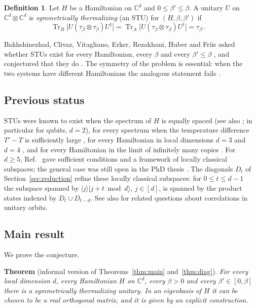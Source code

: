 \documentclass[11pt]{amsart}
\theoremstyle{definition}
\newtheorem{definition}[lemma]{Definition}
\theoremstyle{remark}
\numberwithin{equation}{section}
\newcommand{\C}{\mathbb{C}}
\newcommand{\Tr}{\operatorname{Tr}}
\begin{document}
\begin{definition}\label{def:stu}
Let $H$ be a Hamiltonian on $\C^d$ and $0\le\beta'\le\beta$. A unitary $U$ on $\C^d\otimes\C^d$ is
\emph{symmetrically thermalizing} (an STU) for $(H,\beta,\beta')$ if
\[
  \Tr_B\bigl[U(\tau_\beta\otimes\tau_\beta)U^\dagger\bigr]
  =\Tr_A\bigl[U(\tau_\beta\otimes\tau_\beta)U^\dagger\bigr]=\tau_{\beta'} .
\]
\end{definition}

Bakhshinezhad, Clivaz, Vitagliano, Erker, Rezakhani, Huber and Friis asked whether STUs exist for
every Hamiltonian, every $\beta$ and every $\beta'\le\beta$ \cite[Question~2]{BakhshinezhadEtAl2019},
and conjectured that they do \cite[Sec.~IV]{BakhshinezhadEtAl2019}. The symmetry of the problem is
essential: when the two systems have different Hamiltonians the analogous statement fails
\cite[Sec.~II.1.1]{BakhshinezhadEtAl2019}.

\subsection{Previous status}
STUs were known to exist when the spectrum of $H$ is equally spaced \cite{HuberEtAl2015} (see also
\cite{JevticJenningsRudolph2012,McKayEtAl2018}; in particular for qubits, $d=2$), for every spectrum when the temperature difference $T'-T$ is
sufficiently large \cite[App.~A.1]{HuberEtAl2015}, for every Hamiltonian in local dimensions $d=3$ and
$d=4$ \cite{BakhshinezhadEtAl2019}, and for every Hamiltonian in the limit of infinitely many copies
\cite[Sec.~II.2.3]{BakhshinezhadEtAl2019}. For $d\ge5$, Ref.~\cite{BakhshinezhadEtAl2019} gave sufficient
conditions and a framework of locally classical subspaces; the general case was still open in the
PhD thesis \cite{Clivaz2020}. The diagonals $D_t$ of Section~\ref{sec:reduction} refine these locally
classical subspaces: for $0\le t\le d-1$ the subspace spanned by $|j\rangle|j+t \bmod d\rangle$, $j\in[d]$,
is spanned by the product states indexed by $D_t\cup D_{t-d}$. See also \cite{JevticJenningsRudolph2012,McKayEtAl2018} for related
questions about correlations in unitary orbits.

\subsection{Main result}
We prove the conjecture.

\medskip
\noindent\textbf{Theorem} (informal version of Theorems~\ref{thm:main} and~\ref{thm:diag}).
\emph{For every local dimension $d$, every Hamiltonian $H$ on $\C^d$, every $\beta>0$ and every
$\beta'\in[0,\beta]$ there is a symmetrically thermalizing unitary. In an eigenbasis of $H$ it can be
chosen to be a real orthogonal matrix, and it is given by an explicit construction.}
\medskip
\end{document}
